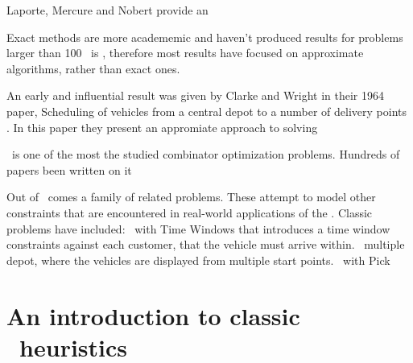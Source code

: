 Laporte, Mercure and Nobert \cite{LMN:1986} provide an

Exact methods are more academemic and haven't produced results for problems larger than 100
\VRP\ is \nphard, therefore most results have focused on approximate algorithms, rather than exact ones.  


An early and influential result was given by Clarke and Wright in their 1964 paper, Scheduling of vehicles from a central depot to a number of delivery points \cite{clark:1964}. In this paper they present an appromiate approach to solving 



\VRP\ is one of the most the studied combinator optimization problems. Hundreds of papers been written on it  

Out of \VRP\ comes a family of related problems. These attempt to model other constraints that are encountered in real-world applications of the \VRP. Classic problems have included: \VRP\ with Time Windows that introduces a time window constraints  against each customer, that the vehicle must arrive within. \VRP\ multiple depot, where the vehicles are displayed from multiple start points. \VRP\ with Pick   

\subsection{\VRPTW}

\subsection{\PDPTW}


\section{An introduction to classic \VRP\ heuristics}

